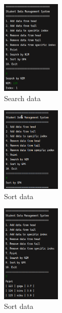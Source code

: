\documentclass[12pt,titlepage]{article}
\begin{document}
\begin{enumerate}
{        \pagebreak

        \begin{figure}[h]
            \centering
            \includegraphics[width=0.25\textwidth]{./images/4-8.png}
            \caption{Search data}
        \end{figure}

        \pagebreak

        \begin{figure}[h]
            \centering
            \includegraphics[width=0.25\textwidth]{./images/4-9-1.png}
            \caption{Sort data}
        \end{figure}

        \begin{figure}[h]
            \centering
            \includegraphics[width=0.25\textwidth]{./images/4-9-2.png}
            \caption{Sort data}
        \end{figure}

        \pagebreak

}
\end{enumerate}
\end{document}
